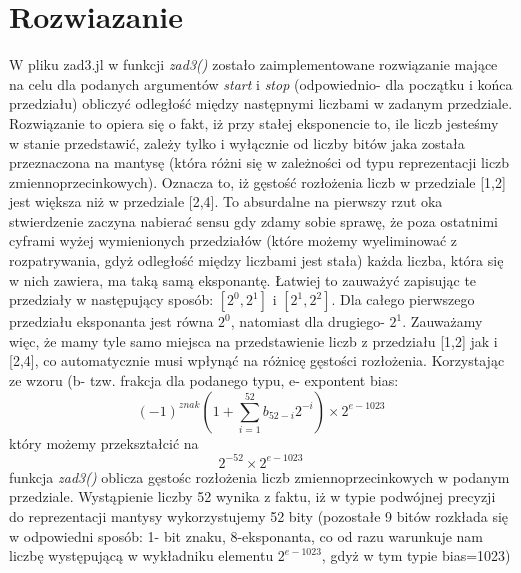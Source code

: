 \documentclass[a4paper,14pt]{report}
\begin{document}
\section{Rozwiazanie}
W pliku zad3.jl w funkcji \textit{zad3()} zostało zaimplementowane rozwiązanie mające na celu dla podanych argumentów \textit{start} i \textit{stop} (odpowiednio- dla początku i końca przedziału) obliczyć odległość między następnymi liczbami w zadanym przedziale. Rozwiązanie to opiera się o fakt, iż przy stałej eksponencie to, ile liczb jesteśmy w stanie przedstawić, zależy tylko i wyłącznie od liczby bitów jaka została przeznaczona na mantysę (która różni się w zależności od typu reprezentacji liczb zmiennoprzecinkowych). Oznacza to, iż gęstość rozłożenia liczb w przedziale [1,2] jest większa niż w przedziale [2,4]. To absurdalne na pierwszy rzut oka stwierdzenie zaczyna nabierać sensu gdy zdamy sobie sprawę, że poza ostatnimi cyframi wyżej wymienionych przedziałów (które możemy wyeliminować z rozpatrywania, gdyż odległość między liczbami jest stała) każda liczba, która się w nich zawiera, ma taką samą eksponantę. Łatwiej to zauważyć zapisując te przedziały w następujący sposób: $ [2^{0},2^{1}] $ i $ [2^{1},2^{2}] $.
Dla całego pierwszego przedziału eksponanta jest równa $ 2^{0} $, natomiast dla drugiego- $ 2^{1}$. Zauważamy więc, że mamy tyle samo miejsca na przedstawienie liczb z przedziału [1,2] jak i [2,4], co automatycznie musi wpłynąć na różnicę gęstości rozłożenia.
Korzystając ze wzoru (b- tzw. frakcja dla podanego typu, e- expontent bias:
\begin{equation}
 (-1)^{znak}\left(1+\sum _{i=1}^{52}b_{52-i}2^{-i}\right)\times 2^{e-1023}
\end{equation}
który możemy przekształcić na
\begin{equation}
  2^{-52} \times 2^{e-1023}
  \label{zad3}
\end{equation}
funkcja \textit{zad3()} oblicza gęstośc rozłożenia liczb zmiennoprzecinkowych w podanym przedziale. Wystąpienie liczby 52 wynika z faktu, iż w typie podwójnej precyzji do reprezentacji mantysy wykorzystujemy 52 bity (pozostałe 9 bitów rozkłada się w odpowiedni sposób: 1- bit znaku, 8-eksponanta, co od razu warunkuje nam liczbę występującą w wykładniku elementu $2^{e-1023}$, gdyż w tym typie bias=1023)
\end{document}
